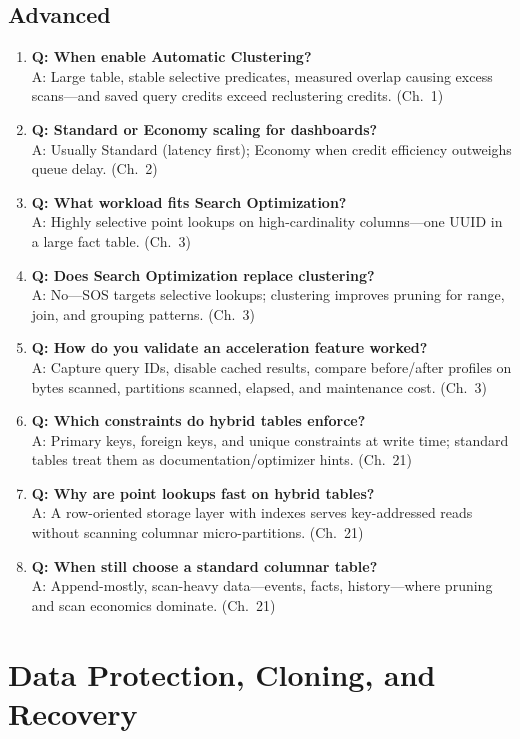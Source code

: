 \subsection{Advanced}
\begin{enumerate}
    \item \textbf{Q: When enable Automatic Clustering?}\\
    A: Large table, stable selective predicates, measured overlap causing excess scans---and saved query credits exceed reclustering credits. (Ch.~1)
    \item \textbf{Q: Standard or Economy scaling for dashboards?}\\
    A: Usually Standard (latency first); Economy when credit efficiency outweighs queue delay. (Ch.~2)
    \item \textbf{Q: What workload fits Search Optimization?}\\
    A: Highly selective point lookups on high-cardinality columns---one UUID in a large fact table. (Ch.~3)
    \item \textbf{Q: Does Search Optimization replace clustering?}\\
    A: No---SOS targets selective lookups; clustering improves pruning for range, join, and grouping patterns. (Ch.~3)
    \item \textbf{Q: How do you validate an acceleration feature worked?}\\
    A: Capture query IDs, disable cached results, compare before/after profiles on bytes scanned, partitions scanned, elapsed, and maintenance cost. (Ch.~3)
    \item \textbf{Q: Which constraints do hybrid tables enforce?}\\
    A: Primary keys, foreign keys, and unique constraints at write time; standard tables treat them as documentation/optimizer hints. (Ch.~21)
    \item \textbf{Q: Why are point lookups fast on hybrid tables?}\\
    A: A row-oriented storage layer with indexes serves key-addressed reads without scanning columnar micro-partitions. (Ch.~21)
    \item \textbf{Q: When still choose a standard columnar table?}\\
    A: Append-mostly, scan-heavy data---events, facts, history---where pruning and scan economics dominate. (Ch.~21)
\end{enumerate}

\section{Data Protection, Cloning, and Recovery}

